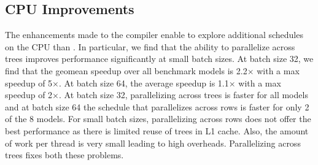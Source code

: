 


\subsection{CPU Improvements}
The enhancements made to the compiler enable \Treebeard{} to explore additional schedules on the CPU
than \TreebeardOLD{}. 
In particular, we find that the ability to parallelize across trees improves performance 
significantly at small batch sizes. At batch size 32, we find that the geomean speedup over 
all benchmark models is 2.2$\times$ with a max speedup of 5$\times$. At batch size 64, the average speedup
is 1.1$\times$ with a max speedup of 2$\times$. At batch size 32, parallelizing across trees is faster 
for all models and at batch size 64 the \TreebeardOLD{} schedule that parallelizes across 
rows is faster for only 2 of the 8 models. For small batch sizes, parallelizing across rows does 
not offer the best performance as there is limited reuse of trees in L1 cache.
Also, the amount of work per thread is very small leading to high overheads. 
Parallelizing across trees fixes both these problems. 

